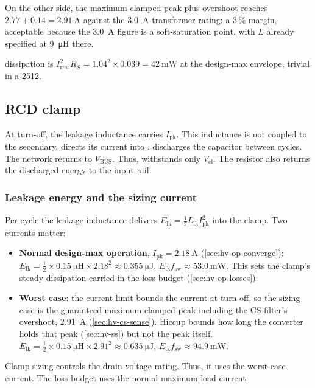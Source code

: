 On the other side, the maximum clamped peak plus overshoot reaches
$2.77 + 0.14 = \SI{2.91}{\ampere}$ against the \SI{3.0}{\ampere} transformer
rating: a 3\,\% margin, acceptable because the \SI{3.0}{\ampere} figure is a
soft-saturation point, with $L$ already specified at \SI{9}{\micro\henry}
there.

 dissipation is $I_{\mathrm{rms}}^2 R_S = 1.04^2 \times 0.039 =
\SI{42}{\milli\watt}$ at the design-max envelope, trivial in a 2512.

\subsection{RCD clamp}\label{sec:hv-clamp}

At turn-off, the leakage inductance carries $I_{\mathrm{pk}}$. This inductance
is not coupled to the secondary.  directs its current into
.  discharges the capacitor between cycles. The
network returns to $V_{\mathrm{BUS}}$. Thus,  withstands only
$V_{\mathrm{cl}}$. The resistor also returns the discharged energy to the input
rail.

\subsubsection{Leakage energy and the sizing current}

Per cycle the leakage inductance delivers $E_{\mathrm{lk}} = \tfrac{1}{2}
L_{\mathrm{lk}} I_{\mathrm{pk}}^2$ into the clamp. Two currents matter:
\begin{itemize}[nosep]
  \item \textbf{Normal design-max operation}, $I_{\mathrm{pk}} =
    \SI{2.18}{\ampere}$ (\cref{sec:hv-op-converge}):
    $E_{\mathrm{lk}} = \tfrac{1}{2}\times\SI{0.15}{\micro\henry}\times 2.18^2
    \approx \SI{0.355}{\micro\joule}$, $E_{\mathrm{lk}} f_{\mathrm{sw}}
    \approx \SI{53.0}{\milli\watt}$. This sets the clamp's steady dissipation
    carried in the loss budget (\cref{sec:hv-op-losses}).
  \item \textbf{Worst case}: the current limit bounds the current at turn-off,
    so the sizing case is the guaranteed-maximum
    clamped peak including the CS filter's overshoot, \SI{2.91}{\ampere}
    (\cref{sec:hv-cs-sense}). Hiccup bounds how long the converter holds that
    peak (\cref{sec:hv-ss}) but not the peak itself.
    $E_{\mathrm{lk}} = \tfrac{1}{2}\times\SI{0.15}{\micro\henry}\times 2.91^2
    \approx \SI{0.635}{\micro\joule}$, $E_{\mathrm{lk}} f_{\mathrm{sw}}
    \approx \SI{94.9}{\milli\watt}$.
\end{itemize}
Clamp sizing controls the  drain-voltage rating. Thus, it uses the
worst-case current. The loss budget uses the normal maximum-load current.

